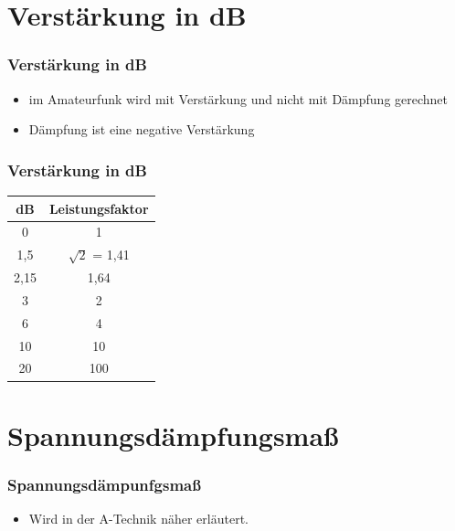 \section{Verst\"arkung in dB}
\begin{frame}
\frametitle{Verst\"arkung in dB}
\begin{itemize}
	\item im Amateurfunk wird mit Verstärkung und nicht mit D\"ampfung gerechnet
	\item D\"ampfung ist eine negative Verst\"arkung
\end{itemize}
\vspace{1cm}
\end{frame}

\begin{frame}
\frametitle{Verst\"arkung in dB}
\begin{center}
	\begin{Large}
	\begin{tabular}{|c|c|}
		\hline
		dB & Leistungsfaktor \\
		\hline \hline
		0    & 1                 \\ \hline
		1,5  & $\sqrt{2}$ = 1,41 \\ \hline
		2,15 & 1,64              \\ \hline
		3    & 2                 \\ \hline
		6    & 4                 \\ \hline
		10   & 10                \\ \hline
		20   & 100               \\ \hline
	\end{tabular}
	\end{Large}		
	\end{center}
\end{frame}

\section*{Spannungsd\"ampfungsma{\ss}}
\begin{frame}
\frametitle{Spannungsd\"ampunfgsma{\ss}}
\vspace{2cm}
\begin{itemize}
	\item Wird in der A-Technik n\"aher erl\"autert.
\end{itemize}
\end{frame}

